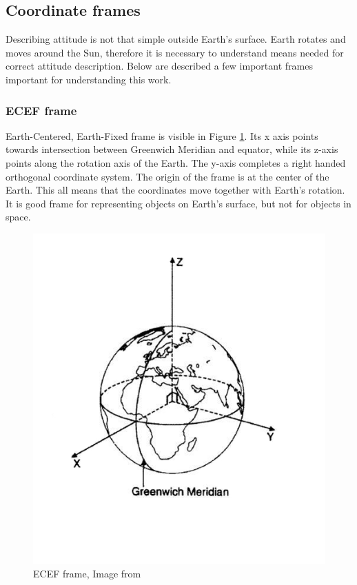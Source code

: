 \documentclass[12pt,a4paper,oneside]{article}
\begin{document}
\subsection{Coordinate frames}
Describing attitude is not that simple outside Earth's surface. Earth rotates and moves around the Sun, therefore it is necessary to understand means needed for correct attitude description.
Below are described a few important frames important for understanding this work. 

\subsubsection{ECEF frame}
Earth-Centered, Earth-Fixed frame is visible in Figure \ref{fig:ecef_frame}. Its x axis points towards intersection between Greenwich Meridian and equator, while its z-axis points along the rotation axis of the Earth. The y-axis completes a right handed orthogonal coordinate system. The origin of the frame is at the center of the Earth.
This all means that the coordinates move together with Earth's rotation. It is good frame for representing objects on Earth's surface, but not for objects in space.

\begin{figure}[!htb]
\includegraphics[scale=0.4]{eci_frame.jpg}
\centering
\caption{ECEF frame, Image from \citet{larson1992space}}
\label{fig:ecef_frame}
\end{figure}
\end{document}
